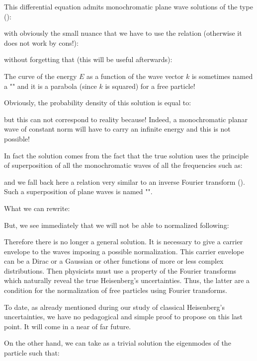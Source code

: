 	This differential equation admits monochromatic plane wave solutions of the type ():
	
	with obviously the small nuance that we have to use the relation (otherwise it does not work by cons!):
	
	without forgetting that (this will be useful afterwards):
	
	The curve of the energy $E$ as a function of the wave vector $k$ is sometimes named a "\label{dispersion curve}" and it is a parabola (since $k$ is squared) for a free particle!

	Obviously, the probability density of this solution is equal to:
	
	but this can not correspond to reality because! Indeed, a monochromatic planar wave of constant norm will have to carry an infinite energy and this is not possible!

	In fact the solution comes from the fact that the true solution uses the principle of superposition of all the monochromatic waves of all the frequencies such as:
	
	and we fall back here a relation very similar to an inverse Fourier transform (). Such a superposition of plane waves is named "\label{wave packet}".
	
	What we can rewrite:
	
	But, we see immediately that we will not be able to normalized following:
	
	Therefore there is no longer a general solution. It is necessary to give a carrier envelope to the waves imposing a possible normalization. This carrier envelope can be a Dirac or a Gaussian or other functions of more or less complex distributions. Then physicists must use a property of the Fourier transforms which naturally reveal the true Heisenberg's uncertainties. Thus, the latter are a condition for the normalization of free particles using Fourier transforms.

	To date, as already mentioned during our study of classical Heisenberg's uncertainties, we have no pedagogical and simple proof to propose on this last point. It will come in a near of far future.

	On the other hand, we can take as a trivial solution the eigenmodes of the particle such that:
	
